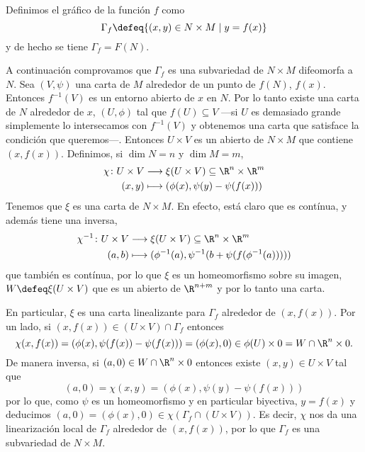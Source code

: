 \documentclass[12pt]{article}
\begin{document}
\parbreak

Definimos el gráfico de la función \( f \) como
\begin{equation*}
	\Gamma_f \defeq \{(x,y) \in N \times M \mid y = f(x)\}
\end{equation*}
y de hecho se tiene \( \Gamma_f = F(N) \).

A continuación comprovamos que \( \Gamma_f \) es una subvariedad de \( N \times M \)
difeomorfa a \( N \). Sea \( (V, \psi) \) una carta de \(
M\) alrededor de un punto de \( f(N) \), \( f(x) \). Entonces \( f^{-1}(V) \) es un
entorno abierto de \( x \) en \( N \). Por lo tanto existe una carta de \( N \) alrededor
de \( x \), \( (U, \phi) \) tal que \( f(U) \subseteq V \) ---si \( U \) es demasiado
grande simplemente lo intersecamos con \( f^{-1}(V) \) y obtenemos una carta que satisface
la condición que queremos---. Entonces \( U \times V \) es un abierto de \( N \times M \)
que contiene \( (x, f(x)) \). Definimos, si \( \dim N = n \) y \( \dim M = m \),
\begin{align*}
	\chi \colon U \times V & \longrightarrow \xi(U \times V) \subseteq \R^n \times \R^m \\
	(x, y) & \longmapsto (\phi(x), \psi(y) - \psi(f(x)))
\end{align*}
Tenemos que \( \xi \) es una carta de \( N \times M \). En efecto, está claro que es contínua, y
además tiene una inversa,
\begin{align*}
	\chi^{-1} \colon U \times V & \longrightarrow \xi(U \times V) \subseteq \R^n \times \R^m \\
	(a, b) & \longmapsto (\phi^{-1}(a), \psi^{-1}(b + \psi(f(\phi^{-1}(a)))))
\end{align*}
que también es contínua, por lo que \( \xi \) es un homeomorfismo sobre su imagen, \( W
\defeq \xi(U \times V) \) que es un abierto de \( \R^{n+m} \) y por lo tanto una
carta.

En particular, \( \xi \) es una carta linealizante para \( \Gamma_f \) alrededor de \( (x,
f(x))\). Por un lado, si \( (x, f(x)) \in (U \times V) \cap
\Gamma_f \) entonces
\begin{equation*}
	\chi(x, f(x)) = (\phi(x), \psi(f(x)) - \psi(f(x))) = (\phi(x), 0) \in \phi(U) \times
	0 = W \cap \R^n \times 0.
\end{equation*}
De manera inversa, si \( (a,0) \in W \cap \R^n \times 0 \) entonces existe \( (x,y) \in U
\times V \) tal que 
\begin{equation*}
	(a,0) = \chi(x,y) = (\phi(x), \psi(y) - \psi(f(x)))
\end{equation*}
por lo que, como	\( \psi \) es un homeomorfismo y en particular biyectiva, \( y = f(x) \)
y deducimos \( (a,0) = (\phi(x), 0) \in \chi(\Gamma_f \cap (U \times V)) \). Es decir,
\( \chi \) nos da una linearización local de \( \Gamma_f \) alrededor de \( (x, f(x))
\), por lo que \( \Gamma_f \) es una subvariedad de \( N \times M \).
\end{document}
